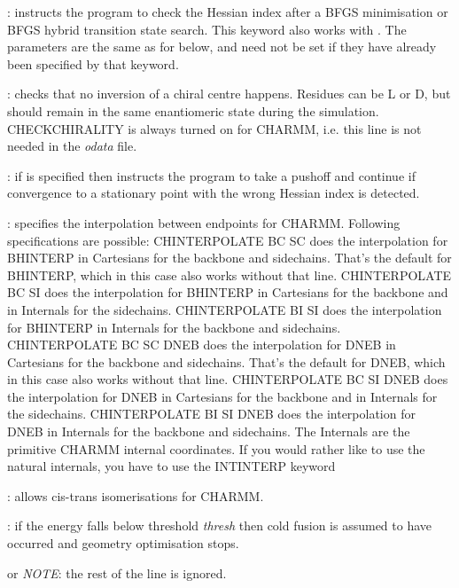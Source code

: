 {{: instructs the program to check the Hessian
index after a BFGS minimisation or BFGS hybrid transition
state search. This keyword also works with {}.
The parameters are the same as for {} below, and need not be set
if they have already been specified by that keyword.

: checks that no inversion of a chiral centre happens.
Residues can be L or D, but should remain in the same enantiomeric state during 
the simulation. CHECKCHIRALITY is always turned on for CHARMM, i.e. this line
is not needed in the {\it odata} file. 

: if {} is specified then {}
instructs the program to take a pushoff and continue if convergence to a stationary
point with the wrong Hessian index is detected. 

: specifies the interpolation between endpoints
for CHARMM. Following specifications are possible: CHINTERPOLATE BC SC does the 
interpolation for BHINTERP in Cartesians for the backbone and sidechains. 
That's the default for BHINTERP, which in this case also works without that line.
CHINTERPOLATE BC SI does the interpolation for BHINTERP in Cartesians for
the backbone and in Internals for the sidechains.
CHINTERPOLATE BI SI does the interpolation for BHINTERP in Internals for
the backbone and sidechains.
CHINTERPOLATE BC SC DNEB does the interpolation for DNEB in Cartesians for
the backbone and sidechains. That's the default for DNEB, which
in this case also works without that line.
CHINTERPOLATE BC SI DNEB does the interpolation for DNEB in Cartesians for
the backbone and in Internals for the sidechains.
CHINTERPOLATE BI SI DNEB does the interpolation for DNEB in Internals for
the backbone and sidechains.
The Internals are the primitive CHARMM internal coordinates. If you would rather like to
use the natural internals, you have to use the INTINTERP keyword

: allows cis-trans isomerisations for CHARMM.

: if the energy falls below threshold {\it thresh} then
cold fusion is assumed to have occurred and geometry optimisation stops.

 or {\it NOTE\/}: the rest of the line is ignored.

}}
